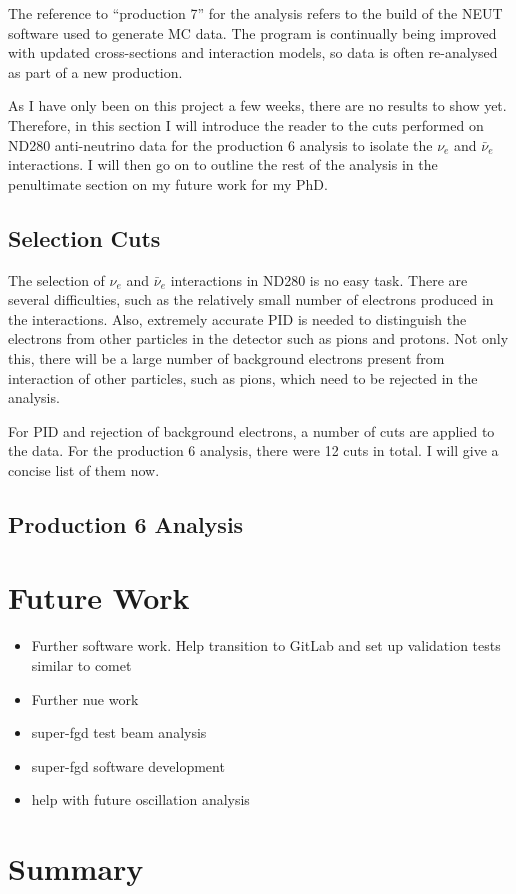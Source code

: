 \documentclass[aps,pra,12pt,notitlepage,tightenlines]{revtex4-1}
\newcommand{\nue}{$\nu_e$ }
\newcommand{\anue}{$\bar\nu_e$ }
\begin{document}
The reference to ``production 7'' for the analysis refers to the build of the NEUT software used to generate MC data. The program is continually being improved with updated cross-sections and interaction models, so data is often re-analysed as part of a new production.

As I have only been on this project a few weeks, there are no results to show yet. Therefore, in this section I will introduce the reader to the cuts performed on ND280 anti-neutrino data for the production 6 analysis to isolate the \nue and \anue interactions. I will then go on to outline the rest of the analysis in the penultimate section on my future work for my PhD.

\subsection{Selection Cuts}
The selection of \nue and \anue interactions in ND280 is no easy task. There are several difficulties, such as the relatively small number of electrons produced in the interactions. Also, extremely accurate PID is needed to distinguish the electrons from other particles in the detector such as pions and protons. Not only this, there will be a large number of background electrons present from interaction of other particles, such as pions, which need to be rejected in the analysis. 

For PID and rejection of background electrons, a number of cuts are applied to the data. For the production 6 analysis, there were 12 cuts in total. I will give a concise list of them now.


\subsection{Production 6 Analysis}

\section{Future Work}
\begin{itemize}
 \item Further software work. Help transition to GitLab and set up validation tests similar to comet
 \item Further nue work
 \item super-fgd test beam analysis
 \item super-fgd software development
 \item help with future oscillation analysis
\end{itemize}


\section{Summary}



\end{document}
